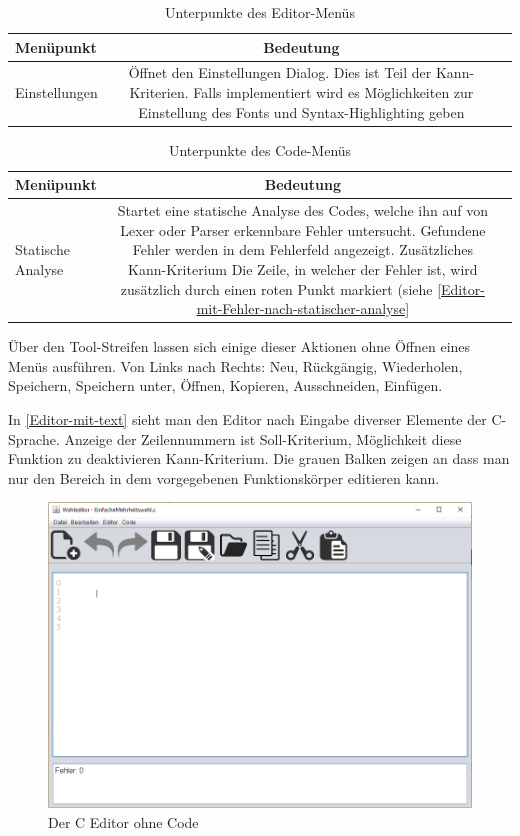 \documentclass[a4paper]{scrreprt}
\begin{document}
\begin{table}[H]
\begin{tabular}{lcr} 
Menüpunkt & Bedeutung \\
\hline
Einstellungen & Öffnet den Einstellungen Dialog. Dies ist Teil der Kann-Kriterien. Falls implementiert wird es Möglichkeiten zur Einstellung des Fonts und Syntax-Highlighting geben 
\end{tabular}
\label{Editor-Menüpunkte}
\caption{Unterpunkte des Editor-Menüs}
\end{table}

\begin{table}[H]
\begin{tabular}{lcr} 
Menüpunkt & Bedeutung \\
\hline
Statische Analyse & Startet eine statische Analyse des Codes, welche ihn auf von Lexer oder Parser erkennbare Fehler untersucht. Gefundene Fehler werden in dem Fehlerfeld angezeigt. Zusätzliches Kann-Kriterium Die Zeile, in welcher der Fehler ist, wird zusätzlich durch einen roten Punkt markiert (siehe \ref{Editor-mit-Fehler-nach-statischer-analyse}
\end{tabular}
\label{Editor-Menüpunkte}
\caption{Unterpunkte des Code-Menüs}
\end{table}

Über den Tool-Streifen lassen sich einige dieser Aktionen ohne Öffnen eines Menüs ausführen. Von Links nach Rechts: Neu, Rückgängig, Wiederholen, Speichern, Speichern unter, Öffnen, Kopieren, Ausschneiden, Einfügen.

In \ref{Editor-mit-text} sieht man den Editor nach Eingabe diverser Elemente der C-Sprache. Anzeige der Zeilennummern ist Soll-Kriterium, Möglichkeit diese Funktion zu deaktivieren Kann-Kriterium. Die grauen Balken zeigen an dass man nur den Bereich in dem vorgegebenen Funktionskörper editieren kann.

\begin{figure}[H]
\includegraphics[scale=0.5]{Editor-ohne-text.png}
\caption{Der C Editor ohne Code}
\end{figure}
\end{document}
